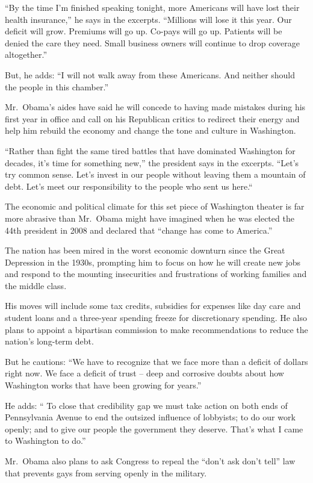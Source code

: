 ﻿\documentclass[12pt]{article}
\begin{document}
``By the time I'm finished speaking tonight, more Americans will have lost their health insurance,''
he says in the excerpts. ``Millions will lose it this year. Our deficit will grow. Premiums will go
up. Co-pays will go up. Patients will be denied the care they need. Small business owners will
continue to drop coverage altogether.''

But, he adds: ``I will not walk away from these Americans. And neither should the people in this
chamber.''

Mr.~Obama's aides have said he will concede to having made mistakes during his first year in office
and call on his Republican critics to redirect their energy and help him rebuild the economy and
change the tone and culture in Washington.

``Rather than fight the same tired battles that have dominated Washington for decades, it's time for
something new,'' the president says in the excerpts. ``Let's try common sense. Let's invest in our
people without leaving them a mountain of debt. Let's meet our responsibility to the people who sent
us here.``

The economic and political climate for this set piece of Washington theater is far more abrasive
than Mr.~Obama might have imagined when he was elected the 44th president in 2008 and declared that
``change has come to America.''

The nation has been mired in the worst economic downturn since the Great Depression in the 1930s,
prompting him to focus on how he will create new jobs and respond to the mounting insecurities and
frustrations of working families and the middle class.

His moves will include some tax credits, subsidies for expenses like day care and student loans and
a three-year spending freeze for discretionary spending. He also plans to appoint a bipartisan
commission to make recommendations to reduce the nation's long-term debt.

But he cautions: ``We have to recognize that we face more than a deficit of dollars right now. We
face a deficit of trust – deep and corrosive doubts about how Washington works that have been
growing for years.''

He adds: `` To close that credibility gap we must take action on both ends of Pennsylvania Avenue to
end the outsized influence of lobbyists; to do our work openly; and to give our people the
government they deserve. That's what I came to Washington to do.''

Mr.~Obama also plans to ask Congress to repeal the ``don't ask don't tell'' law that prevents gays
from serving openly in the military.
\end{document}
